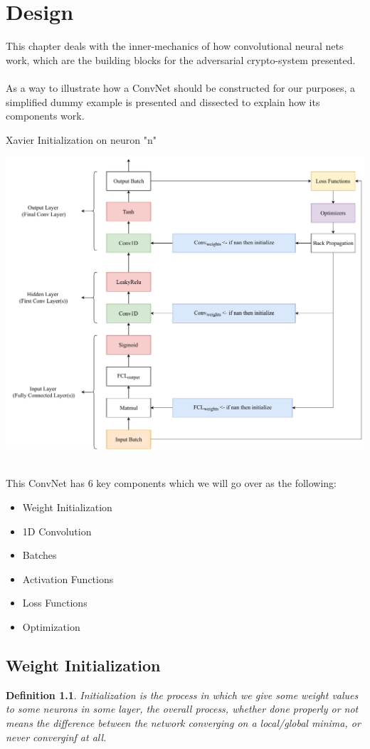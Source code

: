 \documentclass[a4paper, 12pt]{report}
\newtheorem{definition}{Definition}
\begin{document}
\chapter{Design}\label{sec:design}
This chapter deals with the inner-mechanics of how convolutional neural nets work, which are the building blocks for the adversarial crypto-system presented.\\\\
As a way to illustrate how a ConvNet should be constructed for our purposes, a simplified dummy example is presented and dissected to explain how its components work.\\
\begin{blockfigure}{Xavier Initialization on neuron "n"}
	\begin{center}
		\includegraphics[height = 0.45\textheight]{SimpleNetDiagram}
	\end{center}
\end{blockfigure}\\
This ConvNet has 6 key components which we will go over as the following:
\begin{itemize}[nosep]
	\item Weight Initialization
	\item 1D Convolution
	\item Batches
	\item Activation Functions
	\item Loss Functions
	\item Optimization
\end{itemize}
\newpage
\section{\textbf{Weight Initialization}}
\begin{definition}
	Initialization is the process in which we give some weight values to some neurons in some layer, the overall process, whether done properly or not means the difference between the network converging on a local/global minima, or never converginf at all.
\end{definition}
\end{document}
